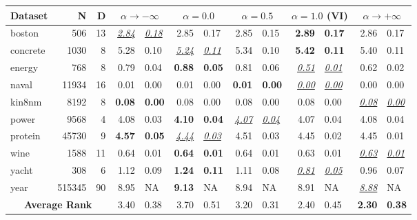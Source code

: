 \centering
{}
\label{tab:bnn_rmse}
\begin{tabular}{l@{\ica}r@{\ica}r@{\ica}r@{$\pm$}l@{\ica}r@{$\pm$}l@{\ica}r@{$\pm$}l@{\ica}r@{$\pm$}l@{\ica}r@{$\pm$}l@{\ica}}
\hline
\bf{Dataset}&{N}&{D}&\multicolumn{2}{c}{\bf{$\alpha \rightarrow -\infty$}}&\multicolumn{2}{c}{\bf{$\alpha = 0.0$}}&\multicolumn{2}{c}{\bf{$\alpha = 0.5$}}&\multicolumn{2}{c}{\bf{$\alpha = 1.0$ (VI)}}&\multicolumn{2}{c}{\bf{$\alpha \rightarrow +\infty$}}\\
\hline
boston&506&13&\underline{\textit{2.84}}&\underline{\textit{0.18}}&2.85&0.17&2.85&0.15&\textbf{2.89}&\textbf{0.17}&2.86&0.17\\
concrete&1030&8&5.28&0.10&\underline{\textit{5.24}}&\underline{\textit{0.11}}&5.34&0.10&\textbf{5.42}&\textbf{0.11}&5.40&0.11\\
energy&768&8&0.79&0.04&\textbf{0.88}&\textbf{0.05}&0.81&0.06&\underline{\textit{0.51}}&\underline{\textit{0.01}}&0.62&0.02\\
naval&11934&16&0.01&0.00&0.01&0.00&\textbf{0.01}&\textbf{0.00}&\underline{\textit{0.00}}&\underline{\textit{0.00}}&0.00&0.00\\
kin8nm&8192&8&\textbf{0.08}&\textbf{0.00}&0.08&0.00&0.08&0.00&0.08&0.00&\underline{\textit{0.08}}&\underline{\textit{0.00}}\\
power&9568&4&4.08&0.03&\textbf{4.10}&\textbf{0.04}&\underline{\textit{4.07}}&\underline{\textit{0.04}}&4.07&0.04&4.08&0.04\\
protein&45730&9&\textbf{4.57}&\textbf{0.05}&\underline{\textit{4.44}}&\underline{\textit{0.03}}&4.51&0.03&4.45&0.02&4.45&0.01\\
wine&1588&11&0.64&0.01&\textbf{0.64}&\textbf{0.01}&0.64&0.01&0.63&0.01&\underline{\textit{0.63}}&\underline{\textit{0.01}}\\
yacht&308&6&1.12&0.09&\textbf{1.24}&\textbf{0.11}&1.11&0.08&\underline{\textit{0.81}}&\underline{\textit{0.05}}&0.96&0.07\\
year&515345&90&8.95&NA&\textbf{9.13}&NA&8.94&NA&8.91&NA&\underline{\textit{8.88}}&NA\\
\hline
\multicolumn{3}{c}{\textbf{Average Rank}}&3.40&0.38&3.70&0.51&3.20&0.31&2.40&0.45&\textbf{2.30}&\textbf{0.38}\\
\hline
\end{tabular}
